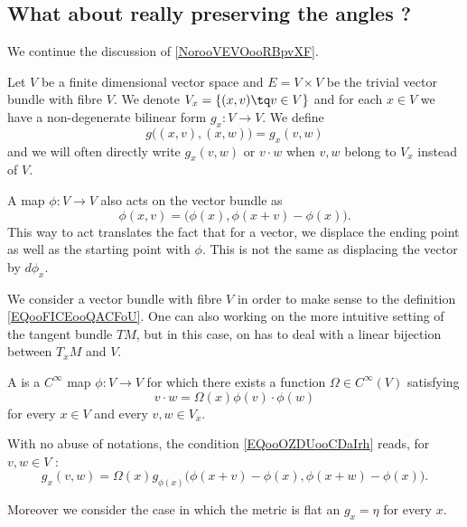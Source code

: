 \subsection{What about really preserving the angles ?}
\label{sebsecooCBKEooQOWqFo}

We continue the discussion of \ref{NorooVEVOooRBpvXF}.

Let \( V\) be a finite dimensional vector space and \( E=V\times V\) be the trivial vector bundle with fibre \( V\). We denote \( V_x=\{ (x,v)\tq v\in V \}\) and for each \( x\in V\) we have a non-degenerate bilinear form \( g_x\colon V\to V\). We define
\begin{equation}
    g\big( (x,v),(x,w) \big)=g_x(v,w)
\end{equation}
and we will often directly write \( g_x(v,w)\) or \( v\cdot w\) when \( v,w\) belong to \(V_x\) instead of \( V\).

A map \( \phi\colon V\to V\) also acts on the vector bundle as
\begin{equation}        \label{EQooFICEooQACFoU}
    \phi(x,v)=\big( \phi(x),\phi(x+v)-\phi(x) \big).
\end{equation}
This way to act translates the fact that for a vector, we displace the ending point as well as the starting point with \( \phi\). This is not the same as displacing the vector by \( d\phi_x\).

\begin{remark}
    We consider a vector bundle with fibre \( V\) in order to make sense to the definition \eqref{EQooFICEooQACFoU}. One can also working on the more intuitive setting of the tangent bundle \( TM\), but in this case, on has to deal with a linear bijection between \( T_xM\) and \( V\).
\end{remark}

\begin{definition}      \label{DEFooVKNBooFBWQQM}
    A  is a \(  C^{\infty}\) map \( \phi\colon V\to V\) for which there exists a function \( \Omega\in C^{\infty}(V)\) satisfying
    \begin{equation}        \label{EQooOZDUooCDaIrh}
        v\cdot w=\Omega(x) \phi(v)\cdot \phi(w)
    \end{equation}
    for every \( x\in V\) and every \( v,w\in V_x\).
\end{definition}
With no abuse of notations, the condition \eqref{EQooOZDUooCDaIrh} reads, for \( v,w\in V\) :
\begin{equation}\label{EQooFZUFooTGWpBn}
    g_x(v,w)=\Omega(x)g_{\phi(x)}\big(  \phi(x+v)-\phi(x),\phi(x+w)-\phi(x)  \big).
\end{equation}

Moreover we consider the case in which the metric is flat an \( g_x=\eta\) for every \( x\).
